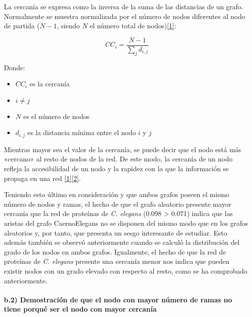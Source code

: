 \documentclass[11pt]{article}
\begin{document}
    La cercanía se expresa como la inversa de la suma de las distancias de
un grafo. Normalmente se muestra normalizada por el número de nodos
diferentes al nodo de partida (\(N-1\), siendo \(N\) el número total de
nodos)\href{https://www.ebi.ac.uk/training/online/course/network-analysis-protein-interaction-data-introduction/building-and-analysing-ppins-1}{{[}1{]}}:

\[ CC_{i} = \frac{N-1}{\sum_{j} d_{i,j}} \]

Donde: 
\begin{itemize}
    \item \(CC_{i}\) es la cercanía
    \item \(i \neq j\)
    \item \(N\) es el número de nodos
    \item \(d_{i,j}\) es la distancia mínima entre el nodo \(i\) y \(j\)
\end{itemize}

Mientras mayor sea el valor de la cercanía, se puede decir que el nodo
está más «cercano» al resto de nodos de la red. De este modo, la
cercanía de un nodo refleja la accesibilidad de un nodo y la rapidez con
la que la información se propaga en una red
\href{https://www.ebi.ac.uk/training/online/course/network-analysis-protein-interaction-data-introduction/building-and-analysing-ppins-1}{{[}1{]}}\href{https://es.wikipedia.org/wiki/Centralidad}{{[}2{]}}.

Teniendo esto último en consideración y que ambos grafos poseen el mismo
número de nodos y ramas, el hecho de que el grafo aleatorio presente
mayor cercanía que la red de proteínas de \emph{C. elegans} (0.098
\textgreater{} 0.071) indica que las aristas del grafo CaernoElegans no
se disponen del mismo modo que en los grafos aleatorios y, por tanto,
que presenta un sesgo interesante de estudiar. Esto además también se
observó anteriormente cuando se calculó la distribución del grado de los
nodos en ambos grafos. Igualmente, el hecho de que la red de proteínas
de \emph{C. elegans} presente una cercanía menor nos indica que pueden
existir nodos con un grado elevado con respecto al resto, como se ha
comprobado anteriormente.

    \hypertarget{b.2-demostraciuxf3n-de-que-el-nodo-con-mayor-nuxfamero-de-ramas-no-tiene-porquuxe9-ser-el-nodo-con-mayor-cercanuxeda}{%
\paragraph{b.2) Demostración de que el nodo con mayor número de ramas no
tiene porqué ser el nodo con mayor
cercanía}\label{b.2-demostraciuxf3n-de-que-el-nodo-con-mayor-nuxfamero-de-ramas-no-tiene-porquuxe9-ser-el-nodo-con-mayor-cercanuxeda}}
\end{document}

